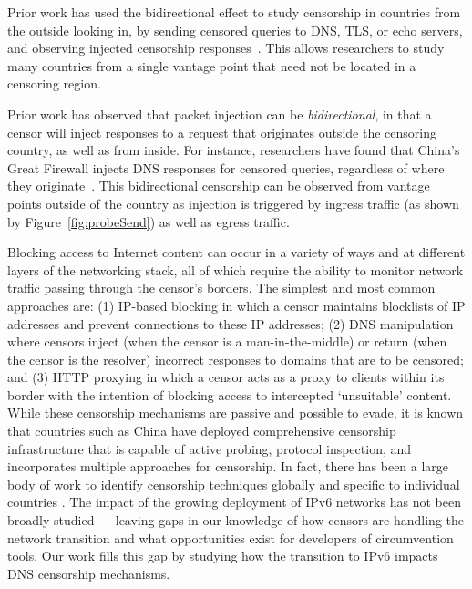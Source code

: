 Prior work has used the bidirectional effect to study censorship in countries from the outside
looking in, by sending censored queries to DNS, TLS, or echo servers, and
observing injected censorship
responses~\cite{quack,pearce2017augur,pearce2017global,scott2016satellite,sundara2020censored}.
This allows researchers to study many countries from a single vantage point that
need not be located in a censoring region.


Prior work has observed that packet injection can be \emph{bidirectional}, in
that a censor will inject responses to a request that originates outside the
censoring country, as well as from inside. For instance, researchers have found
that China's Great Firewall injects DNS responses for censored queries,
regardless of where they originate~\cite{collateral-dns}. This bidirectional
censorship can be observed from vantage points outside of the country as
injection is triggered by ingress traffic (as shown by
Figure~\ref{fig:probeSend}) as well as egress traffic.


Blocking access to Internet content can occur in a variety of ways and at
different layers of the networking stack, all of which require the ability to
monitor network traffic passing through the censor's borders. The simplest and
most common approaches are: (1) IP-based blocking in which a censor maintains
blocklists of IP addresses and prevent connections to these IP addresses; (2)
DNS manipulation where censors inject (when the censor is a man-in-the-middle)
or return (when the censor is the resolver) incorrect responses to domains that
are to be censored; and (3) HTTP proxying in which a censor acts as a proxy to
clients within its border with the intention of blocking access to intercepted
`unsuitable' content.
%
While these censorship mechanisms are passive and possible to evade, it is
known that countries such as China have deployed comprehensive censorship
infrastructure that is capable of active probing, protocol inspection, and
incorporates multiple approaches for censorship.
%
In fact, there has been a large body of work to identify censorship techniques
globally
\cite{pearce2017global, niaki2020iclab, scott2016satellite,
sundara2020censored, filasto2012ooni, pearce2017augur, razaghpanah2016exploring}
and specific to individual countries \cite{USESEC21:GFWatch, aryan2013internet,
ramesh2020decentralized, yadav2018light, gebhart2017internet, nabi2013anatomy}.
%
The impact of the growing deployment of IPv6 networks has not been broadly
studied --- leaving gaps in our knowledge of how censors are handling the
network transition and what opportunities exist for developers of circumvention
tools. Our work fills this gap by studying how the transition to IPv6 impacts
DNS censorship mechanisms.


